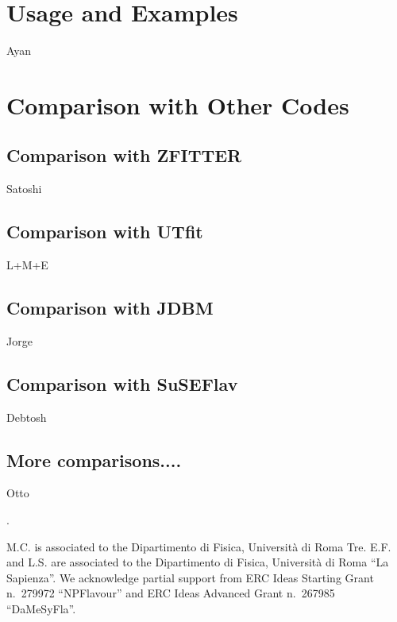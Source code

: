 \documentclass[aps,superscriptaddress,nofootinbib,floatfix,notitlepage]{revtex4-1}
\begin{document}
\section{Usage and Examples}
\label{sec:Usage}

Ayan



\section{Comparison with Other Codes}
\label{sec:Comparison}

\subsection{Comparison with ZFITTER}
\label{sec:ZFitter}

Satoshi

\subsection{Comparison with UTfit}
\label{sec:UTfit}

L+M+E

\subsection{Comparison with JDBM}
\label{sec:JDBM}

Jorge

\subsection{Comparison with SuSEFlav}
\label{sec:Debtosh}

Debtosh

\subsection{More comparisons....}
\label{sec:more}

Otto


\cite{hep-ph/9412201,hep-ph/9908433,hep-ph/0507146,1302.1395}.


\acknowledgments
M.C. is associated to the Dipartimento di Fisica, Universit\`a di Roma
Tre. E.F. and L.S. are associated to the Dipartimento di Fisica,
Universit\`a di Roma ``La Sapienza''. We acknowledge partial support
from ERC Ideas Starting Grant n.~279972 ``NPFlavour'' and ERC Ideas
Advanced Grant n.~267985 ``DaMeSyFla''.


\end{document}
